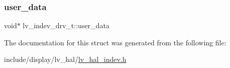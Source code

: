 \mbox{\label{structlv__indev__drv__t_a3b5aa9a6073246e893bbaf2a46118bff}} 
\subsubsection{\texorpdfstring{user\_data}{user\_data}}
{\footnotesize\ttfamily void$\ast$ lv\+\_\+indev\+\_\+drv\+\_\+t\+::user\+\_\+data}



The documentation for this struct was generated from the following file\+:\begin{DoxyCompactItemize}
\item 
include/display/lv\+\_\+hal/\mbox{\hyperlink{lv__hal__indev_8h}{lv\+\_\+hal\+\_\+indev.\+h}}\end{DoxyCompactItemize}
